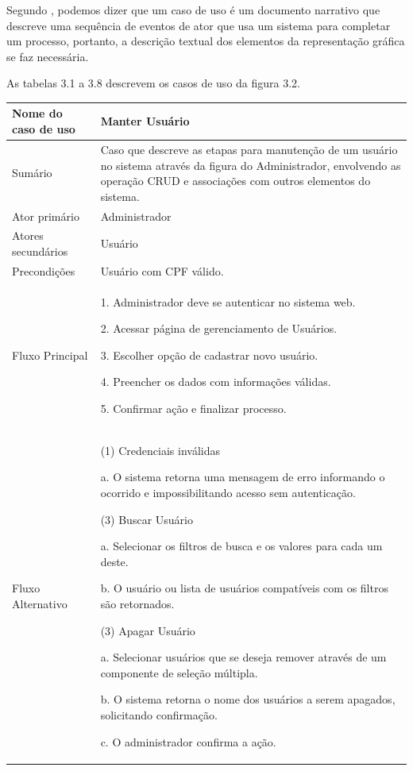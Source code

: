 Segundo \textcite{jacobson:2005}, podemos dizer que um caso de uso é um documento narrativo que descreve uma sequência de eventos de ator que usa um sistema para completar um processo, portanto, a descrição textual dos elementos da representação gráfica se faz necessária.

As tabelas 3.1 a 3.8 descrevem os casos de uso da figura 3.2.

\begin{flushleft}
\tablefirsthead{}
\tablehead{}
\tabletail{}
\tablelasttail{}
\begin{supertabular}{|m{5.5680003cm}|m{9.325cm}|}
\hline
Nome do caso de uso &
Manter Usuário\\\hline
Sumário &
Caso que descreve as etapas para manutenção de um usuário no sistema através da figura do Administrador, envolvendo as operação CRUD e associações com outros elementos do sistema.\\\hline
Ator primário &
Administrador\\\hline
Atores secundários &
Usuário\\\hline
Precondições &
Usuário com CPF válido.\\\hline
Fluxo Principal &
1. Administrador deve se autenticar no sistema web.

2. Acessar página de gerenciamento de Usuários.

3. Escolher opção de cadastrar novo usuário.

4. Preencher os dados com informações válidas.

5. Confirmar ação e finalizar processo.\\\hline
Fluxo Alternativo &
(1) Credenciais inválidas

a. O sistema retorna uma mensagem de erro informando o ocorrido e impossibilitando acesso sem autenticação.

(3) Buscar Usuário

a. Selecionar os filtros de busca e os valores para cada um deste.

b. O usuário ou lista de usuários compatíveis com os filtros são retornados.

(3) Apagar Usuário

a. Selecionar usuários que se deseja remover através de um componente de seleção múltipla.

b. O sistema retorna o nome dos usuários a serem apagados, solicitando confirmação.

c. O administrador confirma a ação.


\end{supertabular}
\end{flushleft}
